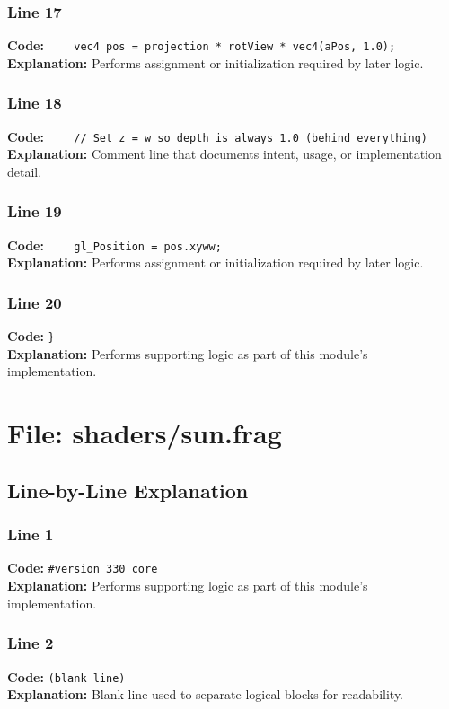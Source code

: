 \documentclass[11pt,a4paper]{article}
\begin{document}
\subsubsection*{Line 17}
\textbf{Code:} \verb|    vec4 pos = projection * rotView * vec4(aPos, 1.0);|\\
\textbf{Explanation:} Performs assignment or initialization required by later logic.

\subsubsection*{Line 18}
\textbf{Code:} \verb|    // Set z = w so depth is always 1.0 (behind everything)|\\
\textbf{Explanation:} Comment line that documents intent, usage, or implementation detail.

\subsubsection*{Line 19}
\textbf{Code:} \verb|    gl_Position = pos.xyww;|\\
\textbf{Explanation:} Performs assignment or initialization required by later logic.

\subsubsection*{Line 20}
\textbf{Code:} \verb|}|\\
\textbf{Explanation:} Performs supporting logic as part of this module's implementation.

\newpage
\section{File: shaders/sun.frag}
\subsection{Line-by-Line Explanation}
\subsubsection*{Line 1}
\textbf{Code:} \verb|#version 330 core|\\
\textbf{Explanation:} Performs supporting logic as part of this module's implementation.

\subsubsection*{Line 2}
\textbf{Code:} \texttt{(blank line)}\\
\textbf{Explanation:} Blank line used to separate logical blocks for readability.
\end{document}
